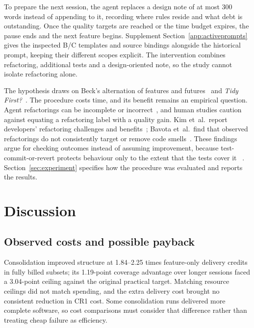 \documentclass[11pt,a4paper]{article}
\begin{document}
To prepare the next session, the agent replaces a design note of at most 300 words instead of appending to it, recording where rules reside and what debt is outstanding.
Once the quality targets are reached or the time budget expires, the pause
ends and the next feature begins. Supplement Section~\ref{app:activeprompts}
gives the inspected B/C templates and source bindings alongside the historical
prompt, keeping their different scopes explicit. The intervention combines
refactoring, additional tests and a design-oriented note, so the study
cannot isolate refactoring alone.

The hypothesis draws on Beck's alternation of features and
futures~\cite{beck2026prodacity,beck2025devslow} and \emph{Tidy
First?}~\cite{beck2023tidy}. The procedure costs time, and its benefit remains
an empirical question. Agent
refactorings can be incomplete or incorrect~\cite{gautam2025refactorbench},
and human studies caution against equating a refactoring label with a
quality gain. Kim et~al.\ report developers' refactoring challenges and
benefits~\cite{kim2014refactoring}; Bavota et~al.\ find that observed
refactorings do not consistently target or remove code
smells~\cite{bavota2015quality}. These findings argue for checking outcomes instead of assuming improvement, because test-commit-or-revert
protects behaviour only to the extent that the tests cover it
~\cite{ma2026building}. Section~\ref{sec:experiment} specifies how
the procedure was evaluated and reports the results.

\FloatBarrier


\FloatBarrier
\section{Discussion}\label{sec:discussion}

\subsection{Observed costs and possible payback}\label{sec:costprojection}

Consolidation improved structure at 1.84--2.25 times feature-only delivery
credits in fully billed subsets; its 1.19-point coverage advantage
over longer sessions faced a 3.04-point ceiling against the original
practical target. Matching resource ceilings did not match spending,
and the extra delivery cost brought no consistent reduction in CR1 cost.
Some consolidation runs delivered more complete software, so cost
comparisons must consider that difference rather than treating cheap
failure as efficiency.
\end{document}

